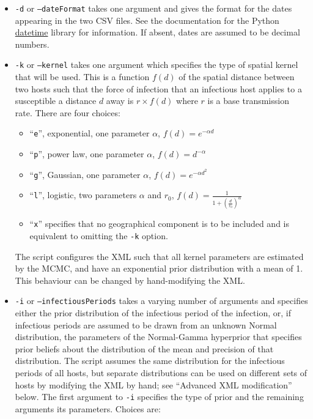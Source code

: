 \documentclass[]{article}
\begin{document}
\begin{itemize}
\item{{\tt-d} or {\tt--dateFormat} takes one argument and gives the format for the dates appearing in the two CSV files. See the documentation for the Python \href{https://docs.python.org/2/library/datetime.html}{datetime} library for information. If absent, dates are assumed to be decimal numbers.}
\item{{\tt-k} or {\tt--kernel} takes one argument which specifies the type of spatial kernel that will be used. This is a function $f(d)$ of the spatial distance between two hosts such that the force of infection that an infectious host applies to a susceptible a distance $d$ away is $r\times f(d)$ where $r$ is a base transmission rate. There are four choices:
	\begin{itemize}
		\item{``{\tt e}'', exponential, one parameter $\alpha$, $f(d)=e^{-\alpha d}$}
		\item{``{\tt p}'', power law, one parameter $\alpha$, $f(d)=d^{-\alpha}$}
		\item{``{\tt g}'', Gaussian, one parameter $\alpha$, $f(d)=e^{-\alpha d^2}$}
		\item{``{\tt l}'', logistic, two parameters $\alpha$ and $r_0$, $f(d)=\frac{1}{1+\left(\frac{d}{r_0}\right)^{\alpha}}$}
		\item{``{\tt x}'' specifies that no geographical component is to be included and is equivalent to omitting the {\tt-k} option.}
	\end{itemize}
The script configures the XML such that all kernel parameters are estimated by the MCMC, and have an exponential prior distribution with a mean of 1. This behaviour can be changed by hand-modifying the XML.}
\item{{\tt-i} or {\tt --infectiousPeriods} takes a varying number of arguments and specifies either the prior distribution of the infectious period of the infection, or, if infectious periods are assumed to be drawn from an unknown Normal distribution, the parameters of the Normal-Gamma hyperprior that specifies prior beliefs about the distribution of the mean and precision of that distribution. The script assumes the same distribution for the infectious periods of all hosts, but separate distributions can be used on different sets of hosts by modifying the XML by hand; see ``Advanced XML modification'' below. The first argument to {\tt-i} specifies the type of prior and the remaining arguments its parameters. Choices are:
	\begin{itemize}

\end{itemize}}
\end{itemize}
\end{document}
